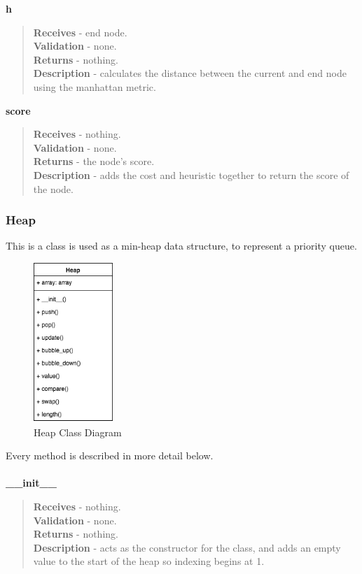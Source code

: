 \documentclass[titlepage]{article}
\begin{document}
\textbf{h}
\begin{quote}
\textbf{Receives} - end node. \\
\textbf{Validation} - none.\\
\textbf{Returns} - nothing. \\
\textbf{Description} - calculates the distance between the current and end node using the manhattan metric.
\end{quote}

\textbf{score}
\begin{quote}
\textbf{Receives} - nothing. \\
\textbf{Validation} - none.\\
\textbf{Returns} - the node's score. \\
\textbf{Description} - adds the cost and heuristic together to return the score of the node.
\end{quote}

\subsubsection{Heap}
This is a class is used as a min-heap data structure, to represent a priority queue.

\begin{figure}[H]
  \centering
  \includegraphics[width=3cm]{heapcd.png}
  \caption{Heap Class Diagram}
  \label{fig:dijk}
\end{figure}

Every method is described in more detail below. \\\\

\textbf{\_\_init\_\_}
\begin{quote}
\textbf{Receives} - nothing. \\
\textbf{Validation} - none.\\
\textbf{Returns} - nothing. \\
\textbf{Description} - acts as the constructor for the class, and adds an empty value to the start of the heap so indexing begins at 1.
\end{quote}
\end{document}
